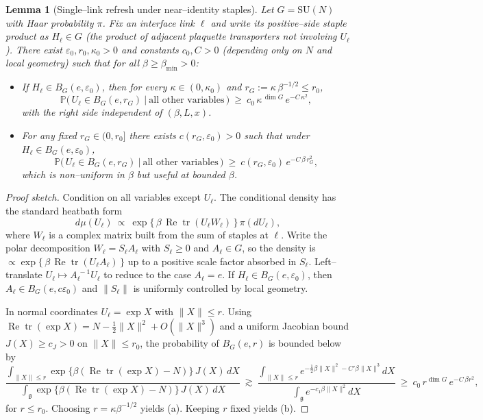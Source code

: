 \documentclass[11pt]{amsart}
\theoremstyle{plain}
\newtheorem{lemma}[theorem]{Lemma}
\theoremstyle{definition}
\theoremstyle{remark}
\begin{document}
\begin{lemma}[Single--link refresh under near--identity staples]\label{lem:single-link-refresh}
Let $G=\mathrm{SU}(N)$ with Haar probability $\pi$. Fix an interface link $\ell$ and write its positive--side staple product as $H_\ell\in G$ (the product of adjacent plaquette transporters not involving $U_\ell$). There exist $\varepsilon_0,r_0,\kappa_0>0$ and constants $c_0,C>0$ (depending only on $N$ and local geometry) such that for all $\beta\ge\beta_{\min}>0$:
\begin{itemize}
  \item[(a) Scale--adapted form (\(\beta\)--uniform).] If $H_\ell\in B_G(e,\varepsilon_0)$, then for every $\kappa\in(0,\kappa_0)$ and $r_G:=\kappa\,\beta^{-1/2}\le r_0$,
  \[
    \mathbb P\big(\,U_\ell\in B_G(e,r_G)\ \big|\ \text{all other variables}\,\big)
      \ \ge\ c_0\, \kappa^{\,\dim G}\, e^{-C\,\kappa^2},
  \]
  with the right side independent of $(\beta,L,x)$.
  \item[(b) Fixed--radius variant.] For any fixed $r_G\in(0,r_0]$ there exists $c(r_G,\varepsilon_0)>0$ such that under $H_\ell\in B_G(e,\varepsilon_0)$,
  \[
    \mathbb P\big(\,U_\ell\in B_G(e,r_G)\ \big|\ \text{all other variables}\,\big)
      \ \ge\ c(r_G,\varepsilon_0)\, e^{-C\,\beta\, r_G^2},
  \]
  which is non--uniform in $\beta$ but useful at bounded $\beta$.
\end{itemize}
\end{lemma}
\begin{proof}[Proof sketch]
Condition on all variables except $U_\ell$. The conditional density has the standard heatbath form
\[
  d\mu(U_\ell)\ \propto\ \exp\{\, \beta\,\operatorname{Re}\operatorname{tr}(U_\ell W_\ell)\,\}\,\pi(dU_\ell),
\]
where $W_\ell$ is a complex matrix built from the sum of staples at $\ell$. Write the polar decomposition $W_\ell= S_\ell A_\ell$ with $S_\ell\ge0$ and $A_\ell\in G$, so the density is $\propto \exp\{\, \beta\,\operatorname{Re}\operatorname{tr}(U_\ell A_\ell)\,\}$ up to a positive scale factor absorbed in $S_\ell$. Left--translate $U_\ell\mapsto A_\ell^{\,-1}U_\ell$ to reduce to the case $A_\ell=e$. If $H_\ell\in B_G(e,\varepsilon_0)$, then $A_\ell\in B_G(e,c\varepsilon_0)$ and $\|S_\ell\|$ is uniformly controlled by local geometry.

In normal coordinates $U_\ell=\exp X$ with $\|X\|\le r$. Using $\operatorname{Re}\operatorname{tr}(\exp X)= N - \tfrac12\|X\|^2 + O(\|X\|^3)$ and a uniform Jacobian bound $J(X)\ge c_J>0$ on $\|X\|\le r_0$, the probability of $B_G(e,r)$ is bounded below by
\[
  \frac{\displaystyle\int_{\|X\|\le r} \exp\{\beta(\operatorname{Re}\operatorname{tr}(\exp X)-N)\}\,J(X)\,dX}{\displaystyle\int_{\mathfrak g} \exp\{\beta(\operatorname{Re}\operatorname{tr}(\exp X)-N)\}\,J(X)\,dX}
  \ \gtrsim\ \frac{\int_{\|X\|\le r} e^{-\frac12\beta\|X\|^2 - C'\beta\|X\|^3} dX}{\int_{\mathfrak g} e^{-c_1\beta\|X\|^2} dX}
  \ \ge\ c_0\, r^{\dim G}\, e^{-C\,\beta r^2},
\]
for $r\le r_0$. Choosing $r=\kappa\beta^{-1/2}$ yields (a). Keeping $r$ fixed yields (b).
\end{proof}
\end{document}
